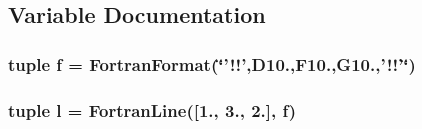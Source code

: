\subsection{Variable Documentation}
\hypertarget{namespacepyneb_1_1utils_1_1_fortran_format_a85d897846bb64fe74a8ce36c2365e3b8}{
\subsubsection[{f}]{\setlength{\rightskip}{0pt plus 5cm}tuple f = {\bf Fortran\-Format}(\char`\"{}'!!',D10.,F10.,G10.,'!!'\char`\"{})}}\label{namespacepyneb_1_1utils_1_1_fortran_format_a85d897846bb64fe74a8ce36c2365e3b8}
\hypertarget{namespacepyneb_1_1utils_1_1_fortran_format_abc599b1f87ca3a4e0ff709091fb25176}{
\subsubsection[{l}]{\setlength{\rightskip}{0pt plus 5cm}tuple l = {\bf Fortran\-Line}(\mbox{[}1., 3., 2.\mbox{]}, {\bf f})}}\label{namespacepyneb_1_1utils_1_1_fortran_format_abc599b1f87ca3a4e0ff709091fb25176}
